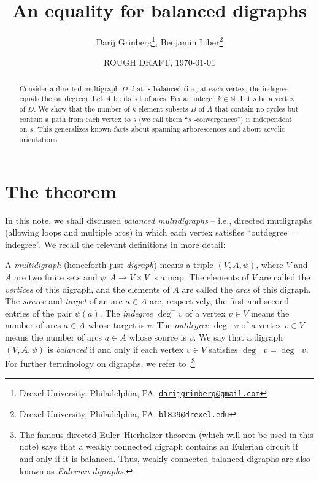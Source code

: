 \documentclass[numbers=enddot,12pt,final,onecolumn,notitlepage]{scrartcl}%
\theoremstyle{definition}
\theoremstyle{plainsl}
\begin{document}
\title{An equality for balanced digraphs}
\author{Darij Grinberg\thanks{Drexel University, Philadelphia, PA.
\href{mailto:darijgrinberg@gmail.com}{\texttt{darijgrinberg@gmail.com}}},
Benjamin Liber\thanks{Drexel University, Philadelphia, PA.
\href{mailto:bl839@drexel.edu}{\texttt{bl839@drexel.edu}}}}
\date{ROUGH DRAFT, \today}
\maketitle

\begin{abstract}
Consider a directed multigraph $D$ that is balanced (i.e., at each vertex, the
indegree equals the outdegree). Let $A$ be its set of arcs. Fix an integer
$k\in\mathbb{N}$. Let $s$ be a vertex of $D$. We show that the number of
$k$-element subsets $B$ of $A$ that contain no cycles but contain a path from
each vertex to $s$ (we call them \textquotedblleft$s$%
-convergences\textquotedblright) is independent on $s$. This generalizes known
facts about spanning arborescences and about acyclic orientations.

\end{abstract}

\section{The theorem}
In this note, we shall discussed \emph{balanced multidigraphs} -- i.e., directed mutligraphs (allowing loops and multiple arcs) in which each vertex satisfies \textquotedblleft outdegree = indegree\textquotedblright. We recall the relevant definitions in more detail:

A \emph{multidigraph} (henceforth just \emph{digraph}) means a triple $(V,A,\psi)$, where $V$ and $A$ are two finite sets and $\psi : A \to V \times V$ is a map. The elements of $V$ are called the \emph{vertices} of this digraph, and the elements of $A$ are called the \emph{arcs} of this digraph. The \emph{source} and \emph{target} of an arc $a \in A$ are, respectively, the first and second entries of the pair $\psi(a)$. The \emph{indegree} $\deg^-v$ of a vertex $v \in V$ means the number of arcs $a \in A$ whose target is $v$. The \emph{outdegree} $\deg^+v$ of a vertex $v \in V$ means the number of arcs $a \in A$ whose source is $v$. We say that a digraph $(V,A,\psi)$ is \emph{balanced} if and only if each vertex $v \in V$ satisfies $\deg^+v = \deg^-v$. For further terminology on
digraphs, we refer to \cite{22s}.\footnote{The famous directed
Euler--Hierholzer theorem (which will not be used in this note) says that a
weakly connected digraph contains an Eulerian circuit if and only if it is
balanced. Thus, weakly connected balanced digraphs are also known as
\emph{Eulerian digraphs}.}
\end{document}
